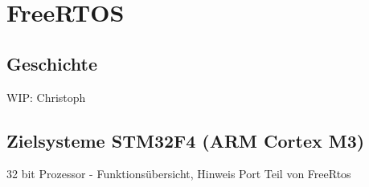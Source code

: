 \documentclass[ngerman]{seminarvorlage}
\begin{document}

\section{FreeRTOS} 
\subsection{Geschichte}
WIP: Christoph
\subsection{Zielsysteme STM32F4 (ARM Cortex M3)}
32 bit Prozessor - Funktionsübersicht, Hinweis Port Teil von FreeRtos
\end{document}
